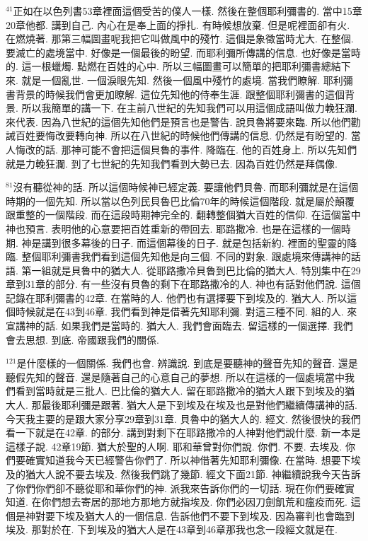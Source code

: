 \documentclass{book}
\begin{document}
$^{41}$正如在以色列書53章裡面這個受苦的僕人一樣.
然後在整個耶利彌書的.
當中15章20章他都.
講到自己.
內心在是奉上面的掙扎.
有時候想放棄.
但是呢裡面卻有火.
在燃燒著.
那第三幅圖畫呢我把它叫做風中的殘竹.
這個是象徵當時尤大.
在整個.
要滅亡的處境當中.
好像是一個最後的盼望.
而耶利彌所傳講的信息.
也好像是當時的.
這一根蠟燭.
點燃在百姓的心中.
所以三幅圖畫可以簡單的把耶利彌書總結下來.
就是一個亂世.
一個淚眼先知.
然後一個風中殘竹的處境.
當我們瞭解.
耶利彌書背景的時候我們會更加瞭解.
這位先知他的侍奉生涯.
跟整個耶利彌書的這個背景.
所以我簡單的講一下.
在主前八世紀的先知我們可以用這個成語叫做力輓狂瀾.
來代表.
因為八世紀的這個先知他們是預言也是警告.
說貝魯將要來臨.
所以他們勸誡百姓要悔改要轉向神.
所以在八世紀的時候他們傳講的信息.
仍然是有盼望的.
當人悔改的話.
那神可能不會把這個貝魯的事件.
降臨在.
他的百姓身上.
所以先知們就是力輓狂瀾.
到了七世紀的先知我們看到大勢已去.
因為百姓仍然是拜偶像.

$^{81}$沒有聽從神的話.
所以這個時候神已經定義.
要讓他們貝魯.
而耶利彌就是在這個時期的一個先知.
所以當以色列民貝魯巴比倫70年的時候這個階段.
就是屬於顛覆跟重整的一個階段.
而在這段時期神完全的.
翻轉整個猶大百姓的信仰.
在這個當中神也預言.
表明他的心意要把百姓重新的帶回去.
耶路撒冷.
也是在這樣的一個時期.
神是講到很多幕後的日子.
而這個幕後的日子.
就是包括新約.
裡面的聖靈的降臨.
整個耶利彌書我們看到這個先知他是向三個.
不同的對象.
跟處境來傳講神的話語.
第一組就是貝魯中的猶大人.
從耶路撒冷貝魯到巴比倫的猶大人.
特別集中在29章到31章的部分.
有一些沒有貝魯的剩下在耶路撒冷的人.
神也有話對他們說.
這個記錄在耶利彌書的42章.
在當時的人.
他們也有選擇要下到埃及的.
猶大人.
所以這個時候就是在43到46章.
我們看到神是借著先知耶利彌.
對這三種不同.
組的人.
來宣講神的話.
如果我們是當時的.
猶大人.
我們會面臨去.
留這樣的一個選擇.
我們會去思想.
到底.
帝國跟我們的關係.

$^{121}$是什麼樣的一個關係.
我們也會.
辨識說.
到底是要聽神的聲音先知的聲音.
還是聽假先知的聲音.
還是隨著自己的心意自己的夢想.
所以在這樣的一個處境當中我們看到當時就是三批人.
巴比倫的猶大人.
留在耶路撒冷的猶大人跟下到埃及的猶大人.
那最後耶利彌是跟著.
猶大人是下到埃及在埃及也是對他們繼續傳講神的話.
今天我主要的是跟大家分享29章到31章.
貝魯中的猶大人的.
經文.
然後很快的我們看一下就是在42章.
的部分.
講到對剩下在耶路撒冷的人神對他們說什麼.
新一本是這樣子說.
42章19節.
猶大於聖的人啊.
耶和華曾對你們說.
你們.
不要.
去埃及.
你們要確實知道我今天已經警告你們了.
所以神借著先知耶利彌像.
在當時.
想要下埃及的猶大人說不要去埃及.
然後我們跳了幾節.
經文下面21節.
神繼續說我今天告訴了你們你們卻不聽從耶和華你們的神.
派我來告訴你們的一切話.
現在你們要確實知道.
在你們想去寄居的那地方那地方就指埃及.
你們必因刀劍飢荒和瘟疫而死.
這個是神對要下埃及猶大人的一個信息.
告訴他們不要下到埃及.
因為審判也會臨到埃及.
那對於在.
下到埃及的猶大人是在43章到46章那我也念一段經文就是在.
\end{document}
